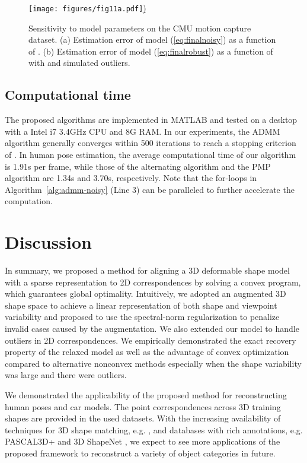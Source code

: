 \documentclass[10pt,journal,cspaper,compsoc]{IEEEtran}
\newcommand{\refEq}[1]{(\ref{#1})}
\newcommand{\refAlg}[1]{Algorithm~\ref{#1}}
\begin{document}
\begin{figure}
\begin{minipage}[b]{0.45\linewidth}
  \centering
  \texttt{[image: figures/fig11a.pdf]}\b)
\end{minipage}
  \caption{Sensitivity to model parameters on the CMU motion capture dataset. (a) Estimation error of model \refEq{eq:finalnoisy} as a function of . (b) Estimation error of model \refEq{eq:finalrobust} as a function of  with  and  simulated outliers.} \label{fig:param}
\end{figure}

\subsection{Computational time}

The proposed algorithms are implemented in MATLAB and tested on a desktop with a Intel i7 3.4GHz CPU and 8G RAM. In our experiments, the ADMM algorithm generally converges within 500 iterations to reach a stopping criterion of . In human pose estimation, the average computational time of our algorithm is 1.91s per frame, while those of the alternating algorithm and the PMP algorithm \cite{ramakrishna2012reconstructing} are 1.34s and 3.70s, respectively. Note that the for-loops in \refAlg{alg:admm-noisy} (Line 3) can be paralleled to further accelerate the computation.

\section{Discussion}\label{sec:discussion}

In summary, we proposed a method for aligning a 3D deformable shape model with a sparse representation to 2D correspondences by solving a convex program, which guarantees global optimality. Intuitively, we adopted an augmented 3D shape space to achieve a linear representation of both shape and viewpoint variability and proposed to use the spectral-norm regularization to penalize invalid cases caused by the augmentation. We also extended our model to handle outliers in 2D correspondences. We empirically demonstrated the exact recovery property of the relaxed model as well as the advantage of convex optimization compared to alternative nonconvex methods especially when the shape variability was large and there were outliers.

We demonstrated the applicability of the proposed method for reconstructing human poses and car models. The point correspondences across 3D training shapes are provided in the used datasets. With the increasing availability of techniques for 3D shape matching, e.g. \cite{huang2013consistent,huang2014functional}, and databases with rich annotations, e.g. PASCAL3D+ \cite{yu2014beyond} and 3D ShapeNet \cite{shapenet}, we expect to see more applications of the proposed framework to reconstruct a variety of object categories in future.
\end{document}
